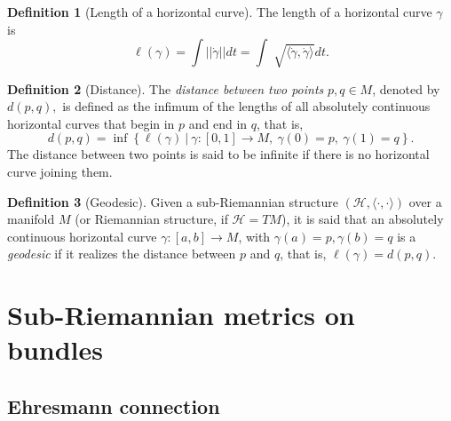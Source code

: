 \documentclass [xcolor=svgnames, t] {beamer}
\theoremstyle{definition}
\newtheorem{df}{Definition}
\theoremstyle{plain}
\theoremstyle{remark}
\begin{document}
\begin{frame}
\begin{df}[Length of a horizontal curve]
	The length of a horizontal curve $ \gamma $ is	
	$$ \ell(\gamma)= \int || \dot{\gamma}|| dt = \int \sqrt[]{ \langle \dot{\gamma},\dot{\gamma} \rangle}dt.  $$ 
\end{df}
\begin{df}[Distance]\label{df:horizontal_distance}
	The \textit{distance between two points} $ p,q\in M $, denoted by $ d(p,q), $   is defined as the infimum of the lengths of all absolutely continuous horizontal curves that begin in $ p $ and end in $ q $, that is, 
$$ d(p,q) = \operatorname{inf} \left\{ \ell(\gamma) \ |\ \gamma:[0,1] \rightarrow {M},\ \gamma(0)=p, \ \gamma(1)=q \right\}. $$ 
The distance between two points is said to be infinite if there is no horizontal curve joining them.
\end{df}
\begin{df}[Geodesic]
	Given a sub-Riemannian structure $ (\mathcal{H}, \langle\cdot,\cdot\rangle) $ over a manifold $ M $  (or Riemannian structure, if $ \mathcal{H}=TM $), it is said that an absolutely continuous horizontal curve $ \gamma:  [a,b] \rightarrow M$, with $ \gamma(a)=p, \gamma(b)=q $ is a \textit{geodesic} if it realizes the distance between $ p $ and $ q $, that is,   
	$ \ell(\gamma)= d(p,q). $ 
\end{df}
\end{frame}
\section{Sub-Riemannian metrics on bundles}
\subsection{Ehresmann connection}%
\label{sub:ehresmann_connection}
\end{document}
